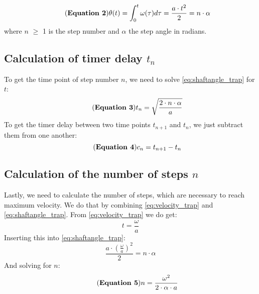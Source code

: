 \documentclass[hidelinks, 11pt, fleqn]{article}   	%
\begin{document}
\newline
\newline
\begin{equation}\tag{\textbf{Equation 2}}\label{eq:shaftangle_trap}
\theta(t) = \int_{0}^{t} \omega(\tau)d\tau = \frac{a \cdot t^2}{2} = n \cdot \alpha
\end{equation}
\newline
where $n$  $\geq$ 1 is the step number and $\alpha$ the step angle in radians.
\newline
\newline
\subsection{Calculation of timer delay $t_{n}$}
To get the time point of step number $n$, we need to solve \eqref{eq:shaftangle_trap} for $t$:
\begin{equation}\tag{\textbf{Equation 3}}
t_{n} = \sqrt{\frac{2 \cdot n \cdot \alpha}{a}}
\end{equation}
To get the timer delay between two time points $t_{n+1}$ and $t_{n}$, we just subtract them from one another:
\begin{equation}\tag{\textbf{Equation 4}}
c_{n} = t_{n+1} - t_{n}
\end{equation}
\subsection{Calculation of the number of steps $n$}
Lastly, we need to calculate the number of steps, which are necessary to reach maximum velocity. We do that by combining \eqref{eq:velocity_trap} and \eqref{eq:shaftangle_trap}.
\newline
\newline
From \eqref{eq:velocity_trap} we do get:
\begin{equation*}
t = \frac{\omega}{a}
\end{equation*}
\newline
Inserting this into \eqref{eq:shaftangle_trap}:
\begin{equation*}
\frac{a \cdot \left(\frac{\omega}{a}\right)^2}{2} = n \cdot \alpha
\end{equation*}
\newline
And solving for $n$:
\begin{equation}\tag{\textbf{Equation 5}}
n = \frac{\omega^2}{2 \cdot \alpha \cdot a}
\end{equation}
\pagebreak
\end{document}
